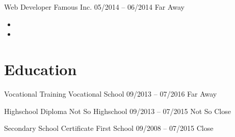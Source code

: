 \documentclass[9pt]{saiba-cv}
\begin{document}
{\begin{minipage}{0.85\textwidth}
{      \entry
        {Web Developer}
        {Famous Inc.}
        {05/2014 -- 06/2014}
        {Far Away}
        {\begin{itemize}[leftmargin=1em,topsep=0em]
          \item \lorem
          \item \lorem
        \end{itemize}}
  
  
      \section*{Education}
      \entry
        {Vocational Training}
        {Vocational School}
        {09/2013 -- 07/2016}
        {Far Away}
        {\lorem}
  
      \entry
        {Highschool Diploma}
        {Not So Highschool}
        {09/2013 -- 07/2015}
        {Not So Close}
        {\lorem}
  
      \entry
        {Secondary School Certificate}
        {First School}
        {09/2008 -- 07/2015}
        {Close}
        {\lorem}

    }
  \end{minipage}
}
\end{document}
